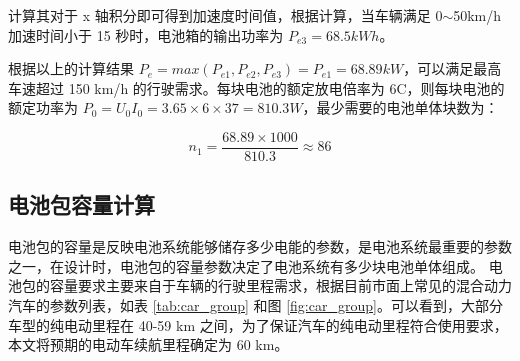 计算其对于 x 轴积分即可得到加速度时间值，根据计算，当车辆满足 0$\sim$50km/h 加速时间小于 15 秒时，电池箱的输出功率为 $P_{e3}=68.5 kWh$。

根据以上的计算结果 $P_e=max(P_{e1},P_{e2},P_{e3})=P_{e1}=68.89 kW$，可以满足最高车速超过 150 km/h 的行驶需求。每块电池的额定放电倍率为 6C，则每块电池的额定功率为 $P_0=U_0I_0=3.65 \times 6 \times 37 =810.3 W$，最少需要的电池单体块数为：

\begin{equation}
	n_1=\frac{68.89\times 1000}{810.3}\approx 86
\end{equation}

\subsection{电池包容量计算}
电池包的容量是反映电池系统能够储存多少电能的参数，是电池系统最重要的参数之一，在设计时，电池包的容量参数决定了电池系统有多少块电池单体组成。
电池包的容量要求主要来自于车辆的行驶里程需求，根据目前市面上常见的混合动力汽车的参数列表，如表 \ref{tab:car_group} 和图 \ref{fig:car_group}。可以看到，大部分车型的纯电动里程在 40-59 km 之间，为了保证汽车的纯电动里程符合使用要求，本文将预期的电动车续航里程确定为 60 km。

